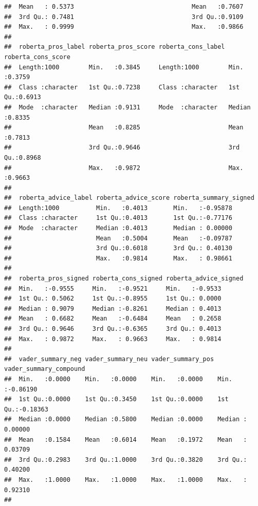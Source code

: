 \documentclass[
]{article}
\begin{document}
\begin{verbatim}
##  Mean   : 0.5373                                Mean   :0.7607       
##  3rd Qu.: 0.7481                                3rd Qu.:0.9109       
##  Max.   : 0.9999                                Max.   :0.9866       
##                                                                      
##  roberta_pros_label roberta_pros_score roberta_cons_label roberta_cons_score
##  Length:1000        Min.   :0.3845     Length:1000        Min.   :0.3759    
##  Class :character   1st Qu.:0.7238     Class :character   1st Qu.:0.6913    
##  Mode  :character   Median :0.9131     Mode  :character   Median :0.8335    
##                     Mean   :0.8285                        Mean   :0.7813    
##                     3rd Qu.:0.9646                        3rd Qu.:0.8968    
##                     Max.   :0.9872                        Max.   :0.9663    
##                                                                             
##  roberta_advice_label roberta_advice_score roberta_summary_signed
##  Length:1000          Min.   :0.4013       Min.   :-0.95878      
##  Class :character     1st Qu.:0.4013       1st Qu.:-0.77176      
##  Mode  :character     Median :0.4013       Median : 0.00000      
##                       Mean   :0.5004       Mean   :-0.09787      
##                       3rd Qu.:0.6018       3rd Qu.: 0.40130      
##                       Max.   :0.9814       Max.   : 0.98661      
##                                                                  
##  roberta_pros_signed roberta_cons_signed roberta_advice_signed
##  Min.   :-0.9555     Min.   :-0.9521     Min.   :-0.9533      
##  1st Qu.: 0.5062     1st Qu.:-0.8955     1st Qu.: 0.0000      
##  Median : 0.9079     Median :-0.8261     Median : 0.4013      
##  Mean   : 0.6682     Mean   :-0.6484     Mean   : 0.2658      
##  3rd Qu.: 0.9646     3rd Qu.:-0.6365     3rd Qu.: 0.4013      
##  Max.   : 0.9872     Max.   : 0.9663     Max.   : 0.9814      
##                                                               
##  vader_summary_neg vader_summary_neu vader_summary_pos vader_summary_compound
##  Min.   :0.0000    Min.   :0.0000    Min.   :0.0000    Min.   :-0.86190      
##  1st Qu.:0.0000    1st Qu.:0.3450    1st Qu.:0.0000    1st Qu.:-0.18363      
##  Median :0.0000    Median :0.5800    Median :0.0000    Median : 0.00000      
##  Mean   :0.1584    Mean   :0.6014    Mean   :0.1972    Mean   : 0.03709      
##  3rd Qu.:0.2983    3rd Qu.:1.0000    3rd Qu.:0.3820    3rd Qu.: 0.40200      
##  Max.   :1.0000    Max.   :1.0000    Max.   :1.0000    Max.   : 0.92310      
##                                                                              

\end{verbatim}
\end{document}
